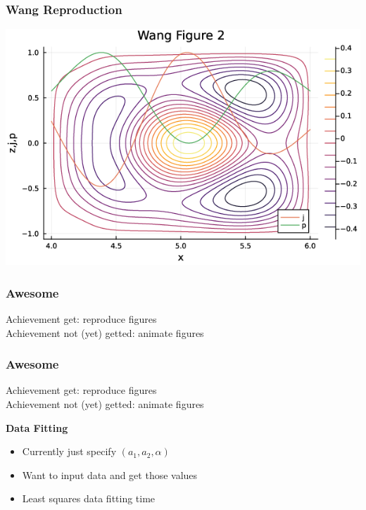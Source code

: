 \documentclass{beamer}
\begin{document}
\begin{frame}
\frametitle{Wang Reproduction}

\centering
\includegraphics[scale=0.5]{imgs/wang-fig-2.png}

\end{frame}










\begin{frame}
\frametitle{Awesome}

Achievement get: reproduce figures\\ \vspace{3em}
Achievement not (yet) getted: animate figures \vspace{7em}


\end{frame}


\begin{frame}
\frametitle{Awesome}

Achievement get: reproduce figures\\ \vspace{3em}
Achievement not (yet) getted: animate figures \vspace{1em}

\textbf{Data Fitting}
\begin{itemize}
    \item Currently just specify $(a_1, a_2, \alpha)$
    \item Want to input data and get those values
    \item Least squares data fitting time
\end{itemize}

\end{frame}
\end{document}
